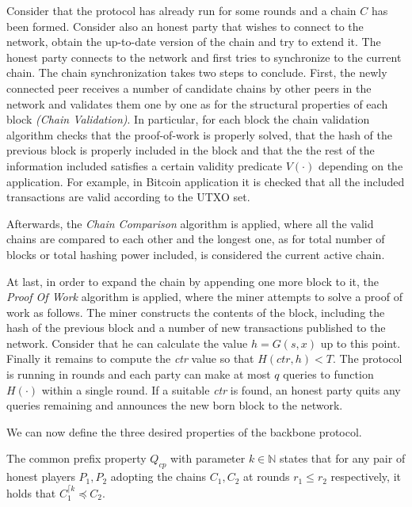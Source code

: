 Consider that the protocol has already run for some rounds and a chain $C$ has been formed. Consider
also an honest party that wishes to connect to the network, obtain the up-to-date version of the
chain and try to extend it.
The honest party connects to the network and first tries to synchronize to the current chain. The
chain synchronization takes two steps to conclude. First, the newly connected peer receives a number
of candidate chains by other peers in the network and validates them one by one as for the structural 
properties of each block \textit{(Chain Validation)}. In particular, for each block the chain
validation algorithm checks that the proof-of-work is properly solved, that the hash of the previous
block is properly included in the block and that the the rest of the information included satisfies
a certain validity predicate $V(\cdot)$ depending on the application. For example, in Bitcoin
application it is checked that all the included transactions are valid according to the
UTXO set.

Afterwards, the \textit{Chain Comparison} algorithm is applied, where all the valid chains are
compared to each other and the longest one, as for total number of blocks or total hashing power
included, is considered the current active chain.

At last, in order to expand the chain by appending one more block to it, the \textit{Proof Of Work}
algorithm is applied, where the miner attempts to solve a proof of work as follows. The miner
constructs the contents of the block, including the hash of the previous block and a number of new
transactions published to the network. Consider that he can calculate the value $h = G(s,x)$ up
to this point. Finally it remains to compute the \textit{ctr} value so that $H(ctr, h) < T$. The
protocol is running in rounds and each party can make at most $q$ queries to function $H(\cdot)$
within a single round. If a suitable \textit{ctr} is found, an honest party quits any queries
remaining and announces the new born block to the network.

We can now define the three desired properties of the backbone protocol.\\
\begin{definition}
	The common prefix property $Q_{cp}$ with parameter
$k \in \mathbb{N}$ states that for any pair of honest players $P_1, P_2$ adopting the chains
$C_1, C_2$ at rounds $r_1 \leq r_2$ respectively, it holds that $C_1^{\lceil k} \preceq C_2$.
	\label{defn:common_prefix}
\end{definition}


